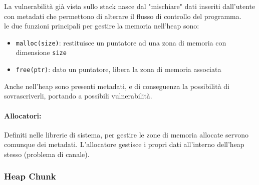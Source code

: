 La vulnerabilità già vista sullo stack nasce dal "mischiare" dati inseriti dall'utente con metadati che permettono di alterare il flusso di controllo del programma.\\

le due funzioni principali per gestire la memoria nell'heap sono: 
\begin{itemize}
	\item \texttt{malloc(size)}: restituisce un puntatore ad una zona di memoria con dimensione \texttt{size}
	\item \texttt{free(ptr)}: dato un puntatore, libera la zona di memoria associata
\end{itemize}

Anche nell'heap sono presenti metadati, e di conseguenza la possibilità di sovrascriverli, portando a possibili vulnerabilità.\\

\paragraph{Allocatori:} Definiti nelle librerie di sistema, per gestire le zone di memoria allocate servono comunque dei metadati. L'allocatore gestisce i propri dati all'interno dell'heap stesso (problema di canale).

\newpage

\subsubsection{Heap Chunk} 

